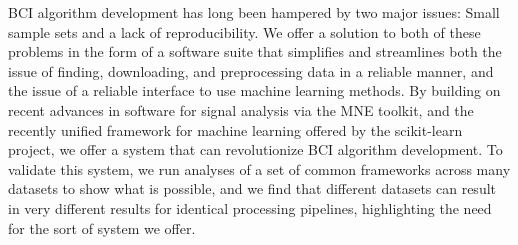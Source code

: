 BCI algorithm development has long been hampered by two major issues: Small
sample sets and a lack of reproducibility. We offer a solution to both of these
problems in the form of a software suite that simplifies and streamlines both
the issue of finding, downloading, and preprocessing data in a reliable manner,
and the issue of a reliable interface to use machine learning methods. By
building on recent advances in software for signal analysis via the MNE toolkit,
and the recently unified framework for machine learning offered by the scikit-learn
project, we offer a system that can revolutionize BCI algorithm
development.  To validate this system, we run analyses of a set of common
frameworks across many datasets to show what is possible, and we find that
different datasets can result in very different results for identical processing
pipelines, highlighting the need for the sort of system we offer.
